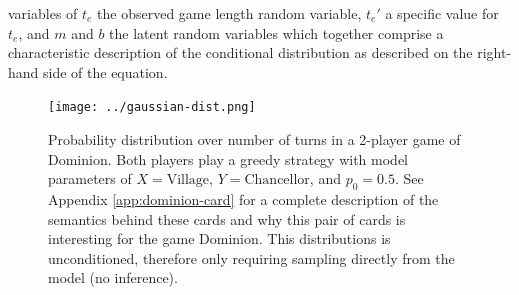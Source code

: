 variables of $t_e$ the observed game
length random variable, $t_e'$ a specific value for $t_e$, and
$m$ and $b$ the latent random variables which together comprise
a characteristic description of the conditional distribution
as described on the right-hand side of the equation.


\begin{figure}
\texttt{[image: ../gaussian-dist.png]}
\caption{\label{fig:turn-dist} Probability distribution over number of turns
in a 2-player game of Dominion.
Both players play a greedy strategy with model
parameters of $X = \textrm{Village}$, $Y = \textrm{Chancellor}$, and
$p_0 = 0.5$. See Appendix \ref{app:dominion-card} for a complete description
of the semantics behind these cards and why this pair of cards is interesting
for the game Dominion.
This distributions is unconditioned, therefore only requiring sampling directly
from the model (no inference).
}\end{figure}


